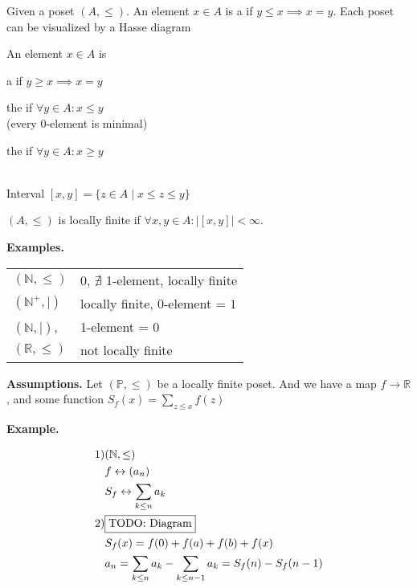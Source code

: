 \begin{definition}
Given a poset $(A, \leq)$.
An element $x \in A$ is a  if $y \leq x \implies x=y$.
Each poset can be visualized by a Hasse diagram


An element $x \in A$ is
\begin{compactitem}
  \item a  if $y \geq x \implies x=y$
  \item the  if $\forall y \in A : x \leq y$ \\
    (every 0-element is minimal)
  \item the  if $\forall y \in A : x \geq y$
\end{compactitem}~\\
Interval $[x,y] = \{z \in A \mid x \leq z \leq y\}$

$(A, \leq)$ is locally finite if $\forall x,y \in A: | [x,y]| < \infty$.
\end{definition}

\textbf{Examples.} \\
\begin{tabular}{ll}
  $(\mathbb{N}, \leq)$
    & 0, $\nexists$ 1-element, locally finite \\
  $(\mathbb{N}^{+}, \mid)$
    & locally finite, 0-element = $1$ \\
  $(\mathbb{N}, \mid)$,
    & 1-element = $0$ \\
  $(\mathbb{R}, \leq)$
    & not locally finite
\end{tabular}

\textbf{Assumptions.}
Let $(\mathbb{P}, \leq)$ be a locally finite poset. And we have a map $f \rightarrow \mathbb{R}$, and some function $S_f(x) = \sum_{z \leq x} f(z)$

\textbf{Example.}

\begin{align*}
  \text{1)}
    & (\mathbb{N}, \leq) \\
    & f \leftrightarrow (a_n) \\
    & S_f \leftrightarrow \sum_{k\leq n} a_k \\
  \text{2)} & \fbox{TODO: Diagram} \\
    & S_f(x) = f(0) + f(a) + f(b) + f(x) \\
    & a_n = \sum_{k \leq n} a_k - \sum_{k \leq n-1} a_k = S_f(n) - S_f(n-1)
\end{align*}


